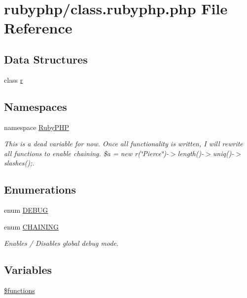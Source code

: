 \hypertarget{class_8rubyphp_8php}{\section{rubyphp/class.rubyphp.\-php File Reference}
\label{class_8rubyphp_8php}
}
\subsection*{Data Structures}
\begin{DoxyCompactItemize}
\item 
class \hyperlink{classr}{r}
\end{DoxyCompactItemize}
\subsection*{Namespaces}
\begin{DoxyCompactItemize}
\item 
namespace \hyperlink{namespace_ruby_p_h_p}{Ruby\-P\-H\-P}
\begin{DoxyCompactList}\small\item\em This is a dead variable for now. Once all functionality is written, I will rewrite all functions to enable chaining. \$a = new r(\char`\"{}\-Pierce\char`\"{})-\/$>$length()-\/$>$uniq()-\/$>$slashes();. \end{DoxyCompactList}\end{DoxyCompactItemize}
\subsection*{Enumerations}
\begin{DoxyCompactItemize}
\item 
enum \hyperlink{class_8rubyphp_8php_a73585d7121de037cf2e2ca12b27eb83e}{D\-E\-B\-U\-G} 
\item 
enum \hyperlink{class_8rubyphp_8php_a2ef56c4551609dbec9cf98bd6008f646}{C\-H\-A\-I\-N\-I\-N\-G} 
\begin{DoxyCompactList}\small\item\em Enables / Disables global debug mode. \end{DoxyCompactList}\end{DoxyCompactItemize}
\subsection*{Variables}
\begin{DoxyCompactItemize}
\item 
\hyperlink{class_8rubyphp_8php_aa75daea491817f3b64daa2f51128bcdf}{\$functions}
\end{DoxyCompactItemize}


